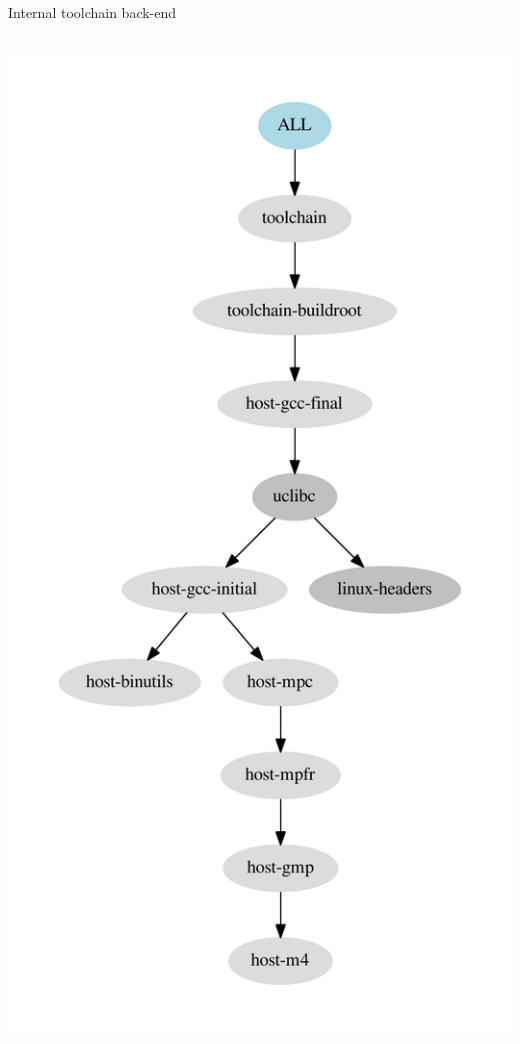 \begin{frame}{Internal toolchain back-end}
\begin{columns}
  \includegraphics[height=0.8\textheight]{slides/buildroot-internals/internal-toolchain-graph-depends.pdf}
\end{columns}

\end{frame}

